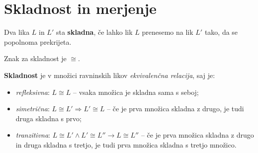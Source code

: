         

\newpage


\section{Skladnost in merjenje}


    \begin{definicija}
        Dva lika $L$ in $L'$ sta \textbf{skladna}, če lahko lik $L$ prenesemo na lik $L'$ tako,
        da se popolnoma prekrijeta.

        Znak za skladnost je $\cong$.
    \end{definicija}

    
        \textbf{Skladnost} je v množici ravninskih likov \textit{ekvivalenčna relacija}, saj je:
        \begin{itemize}
            \item \textit{refleksivna}: $L\cong L$ -- vsaka množica je skladna sama s seboj;
            \item \textit{simetrična}: $L\cong L' \Rightarrow L'\cong L$ -- če je prva množica skladna z drugo, je tudi druga skladna s prvo;
            \item \textit{tranzitivna}: $L\cong L' \land L'\cong L'' \rightarrow L\cong L''$ -- če je prva množica skladna z drugo in druga skladna s tretjo, 
                    je tudi prva množica skladna s tretjo množico.
        \end{itemize}
    

~


